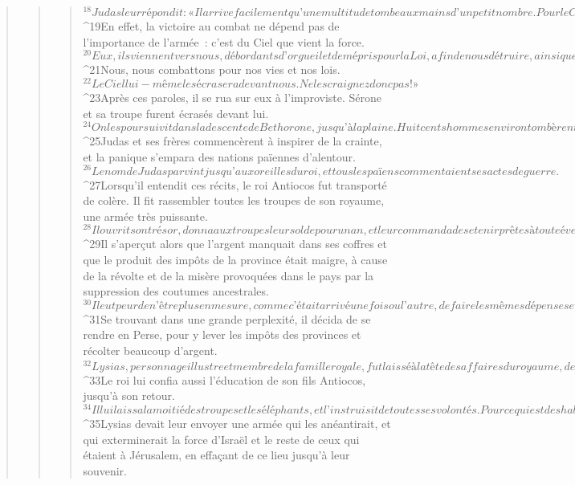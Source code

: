 \begin{verse}
\begin{verse}
\begin{verse}
${}^{18}Judas leur répondit : « Il arrive facilement qu’une multitude tombe aux mains d’un petit nombre. Pour le Ciel, peu importe d’opérer le salut au moyen de beaucoup d’hommes ou seulement de quelques-uns. 
${}^{19}En effet, la victoire au combat ne dépend pas de l’importance de l’armée : c’est du Ciel que vient la force. 
${}^{20}Eux, ils viennent vers nous, débordants d’orgueil et de mépris pour la Loi, afin de nous détruire, ainsi que nos femmes et nos enfants, et de nous dépouiller de nos biens. 
${}^{21}Nous, nous combattons pour nos vies et nos lois. 
${}^{22}Le Ciel lui-même les écrasera devant nous. Ne les craignez donc pas ! »
${}^{23}Après ces paroles, il se rua sur eux à l’improviste. Sérone et sa troupe furent écrasés devant lui. 
${}^{24}On les poursuivit dans la descente de Bethorone, jusqu’à la plaine. Huit cents hommes environ tombèrent ; les autres s’enfuirent au pays des Philistins. 
${}^{25}Judas et ses frères commencèrent à inspirer de la crainte, et la panique s’empara des nations païennes d’alentour. 
${}^{26}Le nom de Judas parvint jusqu’aux oreilles du roi, et tous les païens commentaient ses actes de guerre.
${}^{27}Lorsqu’il entendit ces récits, le roi Antiocos fut transporté de colère. Il fit rassembler toutes les troupes de son royaume, une armée très puissante. 
${}^{28}Il ouvrit son trésor, donna aux troupes leur solde pour un an, et leur commanda de se tenir prêtes à toute éventualité. 
${}^{29}Il s’aperçut alors que l’argent manquait dans ses coffres et que le produit des impôts de la province était maigre, à cause de la révolte et de la misère provoquées dans le pays par la suppression des coutumes ancestrales. 
${}^{30}Il eut peur de n’être plus en mesure, comme c’était arrivé une fois ou l’autre, de faire les mêmes dépenses et largesses qu’auparavant. En effet, il avait l’habitude de distribuer des présents d’une main plus généreuse encore que ses prédécesseurs. 
${}^{31}Se trouvant dans une grande perplexité, il décida de se rendre en Perse, pour y lever les impôts des provinces et récolter beaucoup d’argent. 
${}^{32}Lysias, personnage illustre et membre de la famille royale, fut laissé à la tête des affaires du royaume, depuis les rives de l’Euphrate jusqu’aux frontières de l’Égypte. 
${}^{33}Le roi lui confia aussi l’éducation de son fils Antiocos, jusqu’à son retour. 
${}^{34}Il lui laissa la moitié des troupes et les éléphants, et l’instruisit de toutes ses volontés. Pour ce qui est des habitants de la Judée et de Jérusalem, 
${}^{35}Lysias devait leur envoyer une armée qui les anéantirait, et qui exterminerait la force d’Israël et le reste de ceux qui étaient à Jérusalem, en effaçant de ce lieu jusqu’à leur souvenir. 

\end{verse}
\end{verse}
\end{verse}
